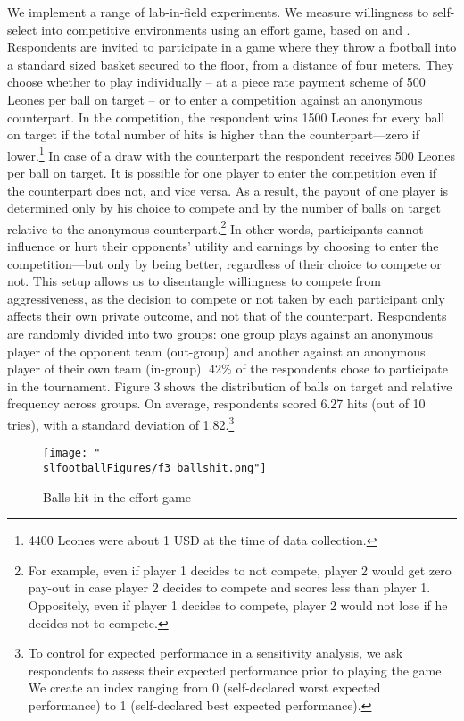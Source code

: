 We implement a range of lab-in-field experiments. We measure willingness to self-select into competitive environments using an effort game, based on \cite{Niederle2007} and \cite{Bartling2009b}. Respondents are invited to participate in a game where they throw a football into a standard sized basket secured to the floor, from a distance of four meters. They choose whether to play individually – at a piece rate payment scheme of 500 Leones per ball on target – or to enter a competition against an anonymous counterpart. In the competition, the respondent wins 1500 Leones for every ball on target if the total number of hits is higher than the counterpart––zero if lower.\footnote{4400 Leones were about 1 USD at the time of data collection.}   In case of a draw with the counterpart the respondent receives 500 Leones per ball on target. It is possible for one player to enter the competition even if the counterpart does not, and vice versa. As a result, the payout of one player is determined only by his choice to compete and by the number of balls on target relative to the anonymous counterpart.\footnote{For example, even if player 1 decides to not compete, player 2 would get zero pay-out in case player 2 decides to compete and scores less than player 1. Oppositely, even if player 1 decides to compete, player 2 would not lose if he decides not to compete.}  In other words, participants cannot influence or hurt their opponents’ utility and earnings by choosing to enter the competition—but only by being better, regardless of their choice to compete or not. This setup allows us to disentangle willingness to compete from aggressiveness, as the decision to compete or not taken by each participant only affects their own private outcome, and not that of the counterpart. Respondents are randomly divided into two groups: one group plays against an anonymous player of the opponent team (out-group) and another against an anonymous player of their own team (in-group). 42\% of the respondents chose to participate in the tournament. Figure 3 shows the distribution of balls on target and relative frequency across groups. On average, respondents scored 6.27 hits (out of 10 tries), with a standard deviation of 1.82.\footnote{To control for expected performance in a sensitivity analysis, we ask respondents to assess their expected performance prior to playing the game. We create an index ranging from 0 (self-declared worst expected performance) to 1 (self-declared best expected performance).}  

\begin{figure}[htb]
  \texttt{[image: "\\slfootballFigures/f3\_ballshit.png"]}
  \caption{Balls hit in the effort game}
  \label{fig:slf:ballshit}
\end{figure}

